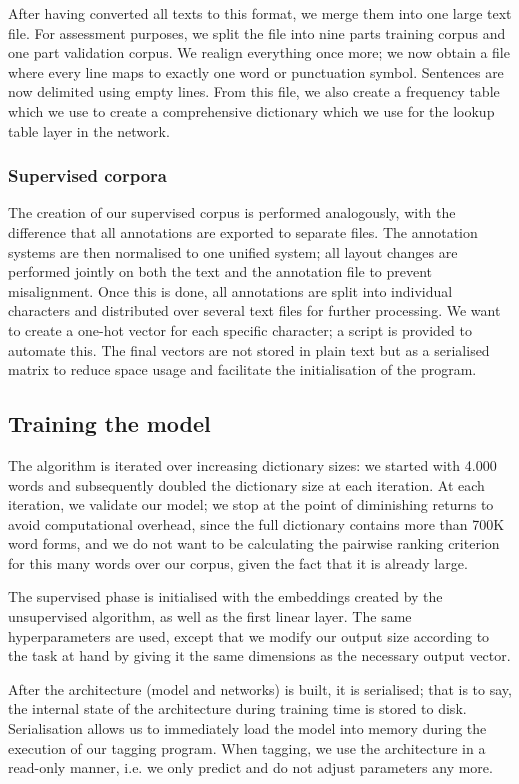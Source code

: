 After having converted all texts to this format, we merge them into
one large text file. For assessment purposes, we split the file into
nine parts training corpus and one part validation corpus. We realign
everything once more; we now obtain a file where every line maps
to exactly one word or punctuation symbol. Sentences are now delimited
using empty lines. From this file, we also create a frequency table
which we use to create a comprehensive dictionary which we use for the
lookup table layer in the network.

\subsubsection{Supervised corpora}
\label{sec:supcorp}
The creation of our supervised corpus is performed analogously, with
the difference that all annotations are exported to separate
files. The annotation systems are then normalised to one unified
system; all layout changes are performed jointly on both the text and
the annotation file to prevent misalignment. Once this is done, all
annotations are split into individual characters and distributed over
several text files for further processing. We want to create a one-hot
vector for each specific character; a script is provided to automate
this. The final vectors are not stored in plain text but as a
serialised matrix to reduce space usage and facilitate the
initialisation of the program.

\subsection{Training the model}
\label{sec:createmodel}
The algorithm is iterated over increasing dictionary sizes: we
started with 4.000 words and subsequently doubled the dictionary size
at each iteration. At each iteration, we validate our model; we stop
at the point of diminishing returns to avoid computational overhead,
since the full dictionary contains more than 700K word forms, and we
do not want to be calculating the pairwise ranking criterion for this
many words over our corpus, given the fact that it is already large.

The supervised phase is initialised with the embeddings created by the
unsupervised algorithm, as well as the first linear layer. The same
hyperparameters are used, except that we modify our output size
according to the task at hand by giving it the same dimensions as the
necessary output vector.

After the architecture (model and networks) is built, it is
serialised; that is to say, the internal state of the architecture
during training time is stored to disk. Serialisation allows us to
immediately load the model into memory during the execution of our
tagging program. When tagging, we use the architecture in a read-only
manner, i.e. we only predict and do not adjust parameters any more.

